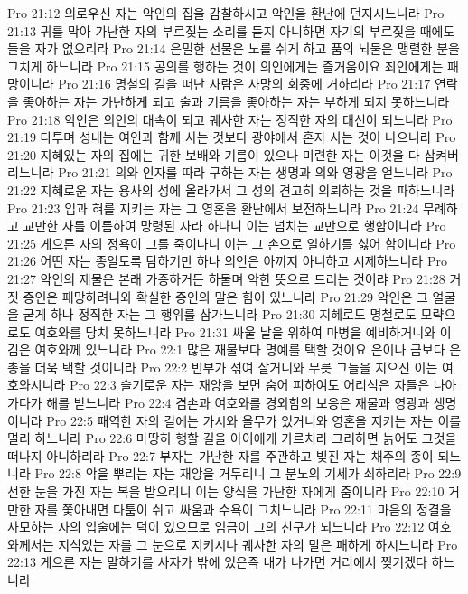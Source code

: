 Pro 21:12  의로우신 자는 악인의 집을 감찰하시고 악인을 환난에 던지시느니라
Pro 21:13  귀를 막아 가난한 자의 부르짖는 소리를 듣지 아니하면 자기의 부르짖을 때에도 들을 자가 없으리라
Pro 21:14  은밀한 선물은 노를 쉬게 하고 품의 뇌물은 맹렬한 분을 그치게 하느니라
Pro 21:15  공의를 행하는 것이 의인에게는 즐거움이요 죄인에게는 패망이니라
Pro 21:16  명철의 길을 떠난 사람은 사망의 회중에 거하리라
Pro 21:17  연락을 좋아하는 자는 가난하게 되고 술과 기름을 좋아하는 자는 부하게 되지 못하느니라
Pro 21:18  악인은 의인의 대속이 되고 궤사한 자는 정직한 자의 대신이 되느니라
Pro 21:19  다투며 성내는 여인과 함께 사는 것보다 광야에서 혼자 사는 것이 나으니라
Pro 21:20  지혜있는 자의 집에는 귀한 보배와 기름이 있으나 미련한 자는 이것을 다 삼켜버리느니라
Pro 21:21  의와 인자를 따라 구하는 자는 생명과 의와 영광을 얻느니라
Pro 21:22  지혜로운 자는 용사의 성에 올라가서 그 성의 견고히 의뢰하는 것을 파하느니라
Pro 21:23  입과 혀를 지키는 자는 그 영혼을 환난에서 보전하느니라
Pro 21:24  무례하고 교만한 자를 이름하여 망령된 자라 하나니 이는 넘치는 교만으로 행함이니라
Pro 21:25  게으른 자의 정욕이 그를 죽이나니 이는 그 손으로 일하기를 싫어 함이니라
Pro 21:26  어떤 자는 종일토록 탐하기만 하나 의인은 아끼지 아니하고 시제하느니라
Pro 21:27  악인의 제물은 본래 가증하거든 하물며 악한 뜻으로 드리는 것이랴
Pro 21:28  거짓 증인은 패망하려니와 확실한 증인의 말은 힘이 있느니라
Pro 21:29  악인은 그 얼굴을 굳게 하나 정직한 자는 그 행위를 삼가느니라
Pro 21:30  지혜로도 명철로도 모략으로도 여호와를 당치 못하느니라
Pro 21:31  싸울 날을 위하여 마병을 예비하거니와 이김은 여호와께 있느니라
Pro 22:1  많은 재물보다 명예를 택할 것이요 은이나 금보다 은총을 더욱 택할 것이니라
Pro 22:2  빈부가 섞여 살거니와 무릇 그들을 지으신 이는 여호와시니라
Pro 22:3  슬기로운 자는 재앙을 보면 숨어 피하여도 어리석은 자들은 나아가다가 해를 받느니라
Pro 22:4  겸손과 여호와를 경외함의 보응은 재물과 영광과 생명이니라
Pro 22:5  패역한 자의 길에는 가시와 올무가 있거니와 영혼을 지키는 자는 이를 멀리 하느니라
Pro 22:6  마땅히 행할 길을 아이에게 가르치라 그리하면 늙어도 그것을 떠나지 아니하리라
Pro 22:7  부자는 가난한 자를 주관하고 빚진 자는 채주의 종이 되느니라
Pro 22:8  악을 뿌리는 자는 재앙을 거두리니 그 분노의 기세가 쇠하리라
Pro 22:9  선한 눈을 가진 자는 복을 받으리니 이는 양식을 가난한 자에게 줌이니라
Pro 22:10  거만한 자를 쫓아내면 다툼이 쉬고 싸움과 수욕이 그치느니라
Pro 22:11  마음의 정결을 사모하는 자의 입술에는 덕이 있으므로 임금이 그의 친구가 되느니라
Pro 22:12  여호와께서는 지식있는 자를 그 눈으로 지키시나 궤사한 자의 말은 패하게 하시느니라
Pro 22:13  게으른 자는 말하기를 사자가 밖에 있은즉 내가 나가면 거리에서 찢기겠다 하느니라
